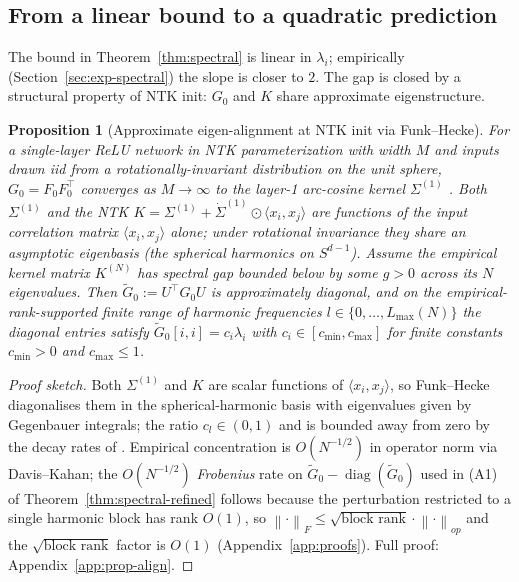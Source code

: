 \documentclass{article}
\newtheorem{proposition}[theorem]{Proposition}
\DeclareMathOperator{\diag}{diag}
\newcommand{\norm}[1]{\left\|#1\right\|}
\newcommand{\Gtilde}{\widetilde{G}}
\begin{document}
\subsection{From a linear bound to a quadratic prediction}
\label{sec:refined}

The bound in Theorem~\ref{thm:spectral} is linear in $\lambda_i$;
empirically (Section~\ref{sec:exp-spectral}) the slope is closer to
$2$. The gap is closed by a structural property of NTK init: $G_0$
and $K$ share approximate eigenstructure.

\begin{proposition}[Approximate eigen-alignment at NTK init via Funk--Hecke]
\label{prop:align}
For a single-layer ReLU network in NTK parameterization with width $M$ and
inputs drawn iid from a rotationally-invariant distribution on the unit
sphere, $G_0 = F_0 F_0^\top$ converges as $M \to \infty$ to the layer-1
arc-cosine kernel $\Sigma^{(1)}$ \citep{cho2009kernel}. Both
$\Sigma^{(1)}$ and the NTK $K = \Sigma^{(1)} + \dot{\Sigma}^{(1)} \odot
\langle x_i, x_j\rangle$ are functions of the input correlation matrix
$\langle x_i, x_j\rangle$ alone; under rotational invariance they share
an asymptotic eigenbasis (the spherical harmonics on $S^{d-1}$). Assume
the empirical kernel matrix $K^{(N)}$ has spectral gap bounded below by
some $g > 0$ across its $N$ eigenvalues. Then $\Gtilde_0 := U^\top G_0 U$
is approximately diagonal, and on the empirical-rank-supported finite
range of harmonic frequencies $l \in \{0, \ldots, L_{\max}(N)\}$ the
diagonal entries satisfy $\Gtilde_0[i,i] = c_i \lambda_i$ with
$c_i \in [c_{\min}, c_{\max}]$ for finite constants $c_{\min} > 0$ and
$c_{\max} \leq 1$.
\end{proposition}

\begin{proof}[Proof sketch]
Both $\Sigma^{(1)}$ and $K$ are scalar functions of $\langle x_i,x_j\rangle$,
so Funk--Hecke \citep[Thm.~2.22]{atkinson2012spherical} diagonalises them
in the spherical-harmonic basis with eigenvalues given by Gegenbauer
integrals; the ratio $c_l\in(0,1)$ and is bounded away from zero by the
decay rates of \citet{bach2017breaking}. Empirical concentration is
$O(N^{-1/2})$ in operator norm \citep{tropp2015introduction} via
Davis--Kahan; the $O(N^{-1/2})$ \emph{Frobenius} rate on
$\Gtilde_0 - \diag(\Gtilde_0)$ used in (A1) of
Theorem~\ref{thm:spectral-refined} follows because the perturbation
restricted to a single harmonic block has rank $O(1)$, so
$\norm{\cdot}_F \leq \sqrt{\text{block rank}}\cdot\norm{\cdot}_{op}$
and the $\sqrt{\text{block rank}}$ factor is $O(1)$
(Appendix~\ref{app:proofs}). Full proof: Appendix~\ref{app:prop-align}.
\end{proof}
\end{document}

